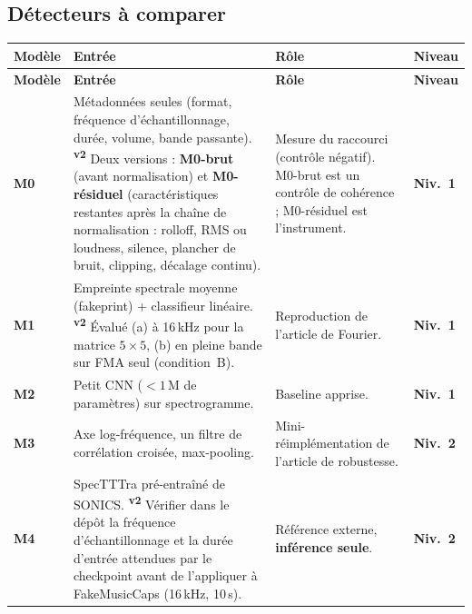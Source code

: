 \documentclass[11pt,a4paper]{article}
\providecommand{\og}{\guillemotleft\nobreakspace}%
\providecommand{\fg}{\nobreakspace\guillemotright}}
\newcommand{\vtwo}{\textsuperscript{\textcolor{orange!80!black}{\textbf{v2}}}}
\newcommand{\nA}{\textbf{Niv.~1}}  %
\newcommand{\nB}{\textbf{Niv.~2}}  %
\begin{document}
\subsection{Détecteurs à comparer}\label{sec:detecteurs}

{\small
\begin{longtable}{L{1.2cm}L{6.4cm}L{5.6cm}L{1.9cm}}
\toprule
\textbf{Modèle} & \textbf{Entrée} & \textbf{Rôle} & \textbf{Niveau}\\
\midrule
\endfirsthead
\toprule
\textbf{Modèle} & \textbf{Entrée} & \textbf{Rôle} & \textbf{Niveau}\\
\midrule
\endhead
\bottomrule
\endfoot
\textbf{M0} & Métadonnées seules (format, fréquence d'échantillonnage, durée, volume, bande passante). \vtwo{} Deux versions : \textbf{M0-brut} (avant normalisation) et \textbf{M0-résiduel} (caractéristiques restantes après la chaîne de normalisation : rolloff, RMS ou loudness, silence, plancher de bruit, clipping, décalage continu). & Mesure du raccourci (contrôle négatif). M0-brut est un contrôle de cohérence ; M0-résiduel est l'instrument. & \nA\\
\addlinespace
\textbf{M1} & Empreinte spectrale moyenne (\og{}fakeprint\fg{}) + classifieur linéaire. \vtwo{} Évalué (a) à 16\,kHz pour la matrice $5\times5$, (b) en pleine bande sur FMA seul (condition~B). & Reproduction de l'article de Fourier. & \nA\\
\addlinespace
\textbf{M2} & Petit CNN ($<1$\,M de paramètres) sur spectrogramme. & Baseline apprise. & \nA\\
\addlinespace
\textbf{M3} & Axe log-fréquence, un filtre de corrélation croisée, max-pooling. & Mini-réimplémentation de l'article de robustesse. & \nB\\
\addlinespace
\textbf{M4} & SpecTTTra pré-entraîné de SONICS. \vtwo{} Vérifier dans le dépôt la fréquence d'échantillonnage et la durée d'entrée attendues par le checkpoint avant de l'appliquer à FakeMusicCaps (16\,kHz, 10\,s). & Référence externe, \textbf{inférence seule}. & \nB\\
\end{longtable}}
\end{document}
